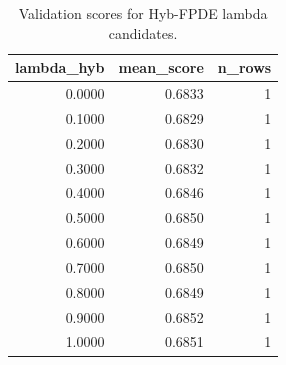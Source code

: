 \begin{table}[t]
\caption{Validation scores for Hyb-FPDE lambda candidates.}
\label{tab:lambda_distribution_computed}
\centering
\begin{tabular}{rrr}
\toprule
lambda\_hyb & mean\_score & n\_rows \\
\midrule
0.0000 & 0.6833 & 1 \\
0.1000 & 0.6829 & 1 \\
0.2000 & 0.6830 & 1 \\
0.3000 & 0.6832 & 1 \\
0.4000 & 0.6846 & 1 \\
0.5000 & 0.6850 & 1 \\
0.6000 & 0.6849 & 1 \\
0.7000 & 0.6850 & 1 \\
0.8000 & 0.6849 & 1 \\
0.9000 & 0.6852 & 1 \\
1.0000 & 0.6851 & 1 \\
\bottomrule
\end{tabular}

\end{table}
